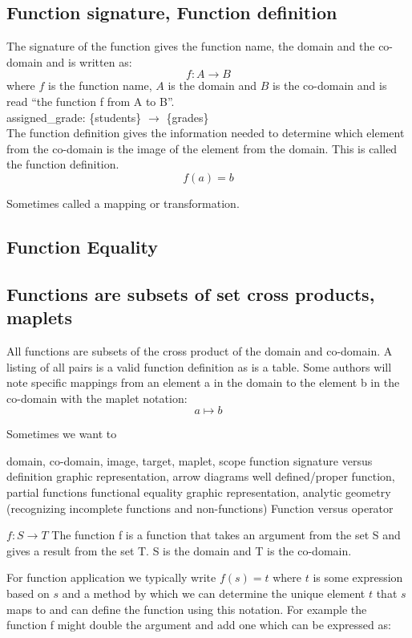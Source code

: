 \documentclass[11pt]{book} %
\theoremstyle {definition}
\theoremstyle {remark}
\begin{document}
\subsection {Function signature, Function definition}
The signature of the function gives the function name, the domain and the co-domain and is written as:
$$f:A \rightarrow B$$ 
where $f$ is the function name, $A$ is the domain and $B$ is the co-domain and is read ``the function f from A to B''. \\
assigned\_grade: \{students\} $\rightarrow$ \{grades\}\\
The function definition gives the information needed to determine which element from the co-domain is the image of the element from the domain. This is called the function definition. 
$$f(a)=b$$

Sometimes called a mapping or transformation.

\subsection {Function Equality}

\subsection {Functions are subsets of set cross products, maplets}
All functions are subsets of the cross product of the domain and co-domain. A listing of all pairs is a valid function definition as is a table. Some authors will note specific mappings from an element a in the domain to the element b in the co-domain with the maplet notation:
$$ a \mapsto b$$ 



Sometimes we want to 

domain, co-domain, image, target, maplet, scope
function signature versus definition
graphic representation, arrow diagrams
well defined/proper function, partial functions
functional equality
graphic representation, analytic geometry (recognizing incomplete functions and non-functions)
Function versus operator

$f:S \rightarrow T$
The function f is a function that takes an argument from the set S and gives a result from the set T. S is the domain and T is the co-domain.

For function application we typically write $f(s)=t$ where $t$ is some expression based on $s$ and a method by which we can determine the unique element $t$ that $s$ maps to and can define the function using this notation. For example the function f might double the argument and add one which can be expressed as:
\end{document}
